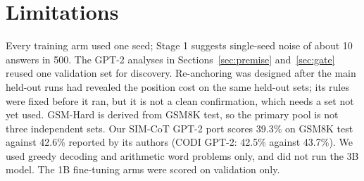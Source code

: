 \documentclass[11pt]{article}
\begin{document}
\section*{Limitations}

Every training arm used one seed; Stage 1 suggests single-seed noise of about 10 answers in 500. The GPT-2 analyses in
Sections~\ref{sec:premise} and~\ref{sec:gate} reused one validation set for discovery. Re-anchoring was designed after the
main held-out runs had revealed the position cost on the same held-out sets; its rules were fixed before it ran, but it is
not a clean confirmation, which needs a set not yet used. GSM-Hard is derived from GSM8K test, so the primary pool is not
three independent sets. Our SIM-CoT GPT-2 port scores 39.3\% on GSM8K test against 42.6\% reported by its authors (CODI
GPT-2: 42.5\% against 43.7\%). We used greedy decoding and arithmetic word problems only, and did not run the 3B model. The
1B fine-tuning arms were scored on validation only.


\end{document}
